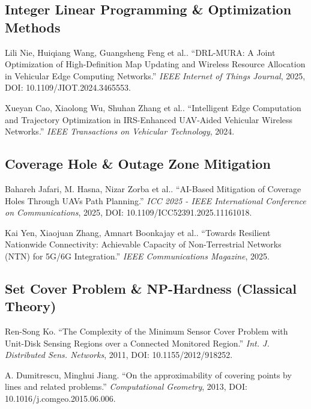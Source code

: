 \documentclass{article}
\begin{document}
\subsection*{Integer Linear Programming \& Optimization Methods}

Lili Nie, Huiqiang Wang, Guangsheng Feng et al.. ``DRL-MURA: A Joint Optimization of High-Definition Map Updating and Wireless Resource Allocation in Vehicular Edge Computing Networks.'' 
\textit{IEEE Internet of Things Journal}, 2025, DOI: 10.1109/JIOT.2024.3465553.

Xueyan Cao, Xiaolong Wu, Shuhan Zhang et al.. ``Intelligent Edge Computation and Trajectory Optimization in IRS-Enhanced UAV-Aided Vehicular Wireless Networks.'' 
\textit{IEEE Transactions on Vehicular Technology}, 2024.



\subsection*{Coverage Hole \& Outage Zone Mitigation}

Bahareh Jafari, M. Hasna, Nizar Zorba et al.. ``AI-Based Mitigation of Coverage Holes Through UAVs Path Planning.'' 
\textit{ICC 2025 - IEEE International Conference on Communications}, 2025, DOI: 10.1109/ICC52391.2025.11161018.

Kai Yen, Xiaojuan Zhang, Amnart Boonkajay et al.. ``Towards Resilient Nationwide Connectivity: Achievable Capacity of Non-Terrestrial Networks (NTN) for 5G/6G Integration.'' 
\textit{IEEE Communications Magazine}, 2025.



\subsection*{Set Cover Problem \& NP-Hardness (Classical Theory)}

Ren-Song Ko. ``The Complexity of the Minimum Sensor Cover Problem with Unit-Disk Sensing Regions over a Connected Monitored Region.'' 
\textit{Int. J. Distributed Sens. Networks}, 2011, DOI: 10.1155/2012/918252.

A. Dumitrescu, Minghui Jiang. ``On the approximability of covering points by lines and related problems.'' 
\textit{Computational Geometry}, 2013, DOI: 10.1016/j.comgeo.2015.06.006.
\end{document}
